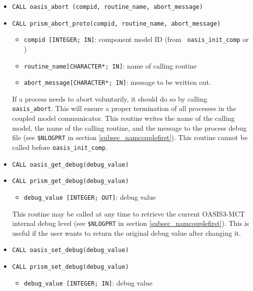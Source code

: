 \begin{itemize}
\item {\tt CALL oasis\_abort (compid, routine\_name, abort\_message)}
\item {\tt CALL prism\_abort\_proto(compid, routine\_name,
    abort\_message)}
  \begin{itemize}
  \item {\tt compid [INTEGER; IN]}: component model ID (from {\tt
      oasis\_init\_comp} or )
  \item {\tt routine\_name[CHARACTER*; IN]}: name of calling routine
  \item {\tt abort\_message[CHARACTER*; IN]}: message to be written
    out.
  \end{itemize}

  If a process needs to abort voluntarily, it should do so by calling
  {\tt oasis\_abort}. This will ensure a proper termination of all
  processes in the coupled model communicator. This routine writes the
  name of the calling model, the name of the calling routine, and the
  message to the process debug file (see {\tt \$NLOGPRT} in section
  \ref{subsec_namcouplefirst}).  This routine cannot be called before
  {\tt oasis\_init\_comp}.

  \vspace{0.2cm}
\item {\tt CALL oasis\_get\_debug(debug\_value)}
\item {\tt CALL prism\_get\_debug(debug\_value)}
  \begin{itemize}
  \item {\tt debug\_value [INTEGER; OUT]}: debug value
  \end{itemize}

  This routine may be called at any time to retrieve the current
  OASIS3-MCT internal debug level (see {\tt \$NLOGPRT} in section
  \ref{subsec_namcouplefirst}).  This is useful if the user wants to
  return the original debug value after changing it.

  \vspace{0.2cm}
\item {\tt CALL oasis\_set\_debug(debug\_value)}
\item {\tt CALL prism\_set\_debug(debug\_value)}
  \begin{itemize}
  \item {\tt debug\_value [INTEGER; IN]}: debug value
  \end{itemize}


\end{itemize}
